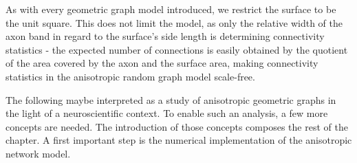 As with every geometric graph model introduced, we restrict the
surface to be the unit square. This does not limit the model, as only
the relative width of the axon band in regard to the surface's side
length is determining connectivity statistics -
the expected number of connections is easily obtained by the quotient
of the area covered by the axon and the surface area, making
connectivity statistics in the anisotropic random graph model
scale-free.

The following maybe interpreted as a study of anisotropic geometric
graphs in the light of a neuroscientific context. To enable such an
analysis, a few more concepts are needed. The introduction of
those concepts composes the rest of the chapter. A first important
step is the numerical implementation of the anisotropic network model.



